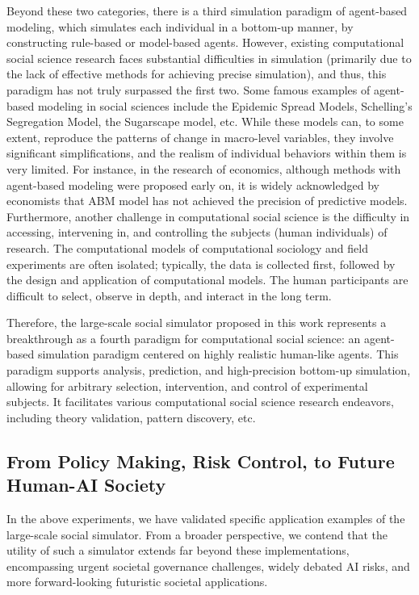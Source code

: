 Beyond these two categories, there is a third simulation paradigm of agent-based modeling, which simulates each individual in a bottom-up manner, by constructing rule-based or model-based agents. However, existing computational social science research faces substantial difficulties in simulation (primarily due to the lack of effective methods for achieving precise simulation), and thus, this paradigm has not truly surpassed the first two. Some famous examples of agent-based modeling in social sciences include the Epidemic Spread Models, Schelling's Segregation Model, the Sugarscape model, etc. While these models can, to some extent, reproduce the patterns of change in macro-level variables, they involve significant simplifications, and the realism of individual behaviors within them is very limited. For instance, in the research of economics, although methods with agent-based modeling were proposed early on, it is widely acknowledged by economists that ABM model has not achieved the precision of predictive models. Furthermore, another challenge in computational social science is the difficulty in accessing, intervening in, and controlling the subjects (human individuals) of research. The computational models of computational sociology and field experiments are often isolated; typically, the data is collected first, followed by the design and application of computational models. The human participants are difficult to select, observe in depth, and interact in the long term.

Therefore, the large-scale social simulator proposed in this work represents a breakthrough as a fourth paradigm for computational social science: an agent-based simulation paradigm centered on highly realistic human-like agents. This paradigm supports analysis, prediction, and high-precision bottom-up simulation, allowing for arbitrary selection, intervention, and control of experimental subjects. It facilitates various computational social science research endeavors, including theory validation, pattern discovery, etc.


\subsection{From Policy Making, Risk Control, to Future Human-AI Society}

In the above experiments, we have validated specific application examples of the large-scale social simulator. From a broader perspective, we contend that the utility of such a simulator extends far beyond these implementations, encompassing urgent societal governance challenges, widely debated AI risks, and more forward-looking futuristic societal applications.

